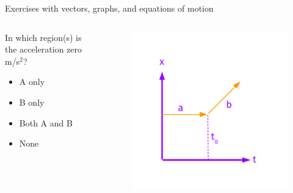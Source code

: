 \documentclass{beamer}
\begin{document}
\begin{frame}{Exercises with vectors, graphs, and equations of motion}
\begin{columns}[T]
\begin{column}{0.4\textwidth}
\small
In which region(s) is the acceleration zero m/s$^2$?
\begin{itemize}
\item A only
\item B only
\item Both A and B
\item None
\end{itemize}
\end{column}
\begin{column}{0.6\textwidth}
\begin{figure}
\centering
\includegraphics[width=\textwidth,trim=0cm 0cm 0cm 1.5cm,clip=true]{figures/Vectors3.pdf}
\end{figure}
\end{column}
\end{columns}
\end{frame}
\end{document}
